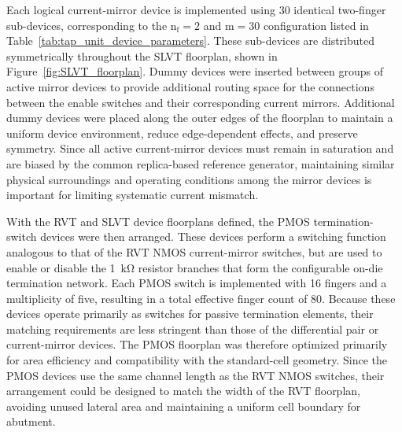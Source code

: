 Each logical current-mirror device is implemented using 30 identical two-finger sub-devices, corresponding to the $\mathrm{n_f=2}$ and $\mathrm{m=30}$ configuration listed in Table~\ref{tab:tap_unit_device_parameters}. These sub-devices are distributed symmetrically throughout the \ac{SLVT} floorplan, shown in Figure~\ref{fig:SLVT_floorplan}. Dummy devices were inserted between groups of active mirror devices to provide additional routing space for the connections between the enable switches and their corresponding current mirrors. Additional dummy devices were placed along the outer edges of the floorplan to maintain a uniform device environment, reduce edge-dependent effects, and preserve symmetry. Since all active current-mirror devices must remain in saturation and are biased by the common replica-based reference generator, maintaining similar physical surroundings and operating conditions among the mirror devices is important for limiting systematic current mismatch.

With the \ac{RVT} and \ac{SLVT} device floorplans defined, the PMOS termination-switch devices were then arranged. These devices perform a switching function analogous to that of the \ac{RVT} NMOS current-mirror switches, but are used to enable or disable the 1~\unit{\kilo\ohm} resistor branches that form the configurable on-die termination network. Each PMOS switch is implemented with 16 fingers and a multiplicity of five, resulting in a total effective finger count of 80. Because these devices operate primarily as switches for passive termination elements, their matching requirements are less stringent than those of the differential pair or current-mirror devices. The PMOS floorplan was therefore optimized primarily for area efficiency and compatibility with the standard-cell geometry. Since the PMOS devices use the same channel length as the \ac{RVT} NMOS switches, their arrangement could be designed to match the width of the \ac{RVT} floorplan, avoiding unused lateral area and maintaining a uniform cell boundary for abutment.

